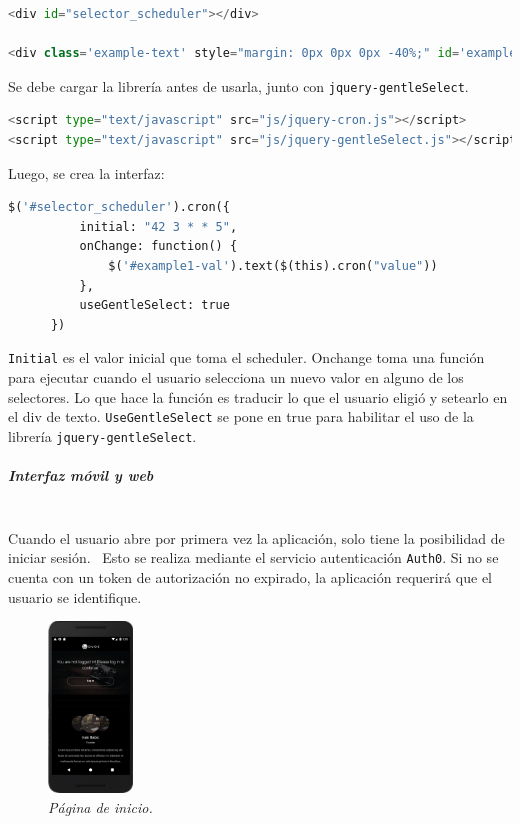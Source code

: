 \begin{lstlisting}[language=python]
<div id="selector_scheduler"></div>

<div class='example-text' style="margin: 0px 0px 0px -40%;" id='example1-val'></div>
\end{lstlisting}

Se debe cargar la librería antes de usarla, junto con \lstinline[columns=fixed]{jquery-gentleSelect}.

\begin{lstlisting}[language=python]
<script type="text/javascript" src="js/jquery-cron.js"></script>
<script type="text/javascript" src="js/jquery-gentleSelect.js"></script>
\end{lstlisting}

Luego, se crea la interfaz:

\begin{lstlisting}[language=python]
$('#selector_scheduler').cron({
          initial: "42 3 * * 5",
          onChange: function() {
              $('#example1-val').text($(this).cron("value"))
          },
          useGentleSelect: true
      })
\end{lstlisting}

\lstinline[columns=fixed]{Initial} es el valor inicial que toma el scheduler. Onchange toma una función para ejecutar cuando el usuario selecciona un nuevo valor en alguno de los selectores. Lo que hace la función es traducir lo que el usuario eligió y setearlo en el div de texto. \lstinline[columns=fixed]{UseGentleSelect} se pone en true para habilitar el uso de la librería \lstinline[columns=fixed]{jquery-gentleSelect}.


\subparagraph{Interfaz móvil y web}\mbox{}\mbox{}\\
Cuando el usuario abre por primera vez la aplicación, solo tiene la posibilidad de iniciar sesión.~ Esto se realiza mediante el servicio autenticación \lstinline[columns=fixed]{Auth0}. Si no se cuenta con un token de autorización no expirado, la aplicación requerirá que el usuario se identifique.

\begin{figure}[H]
  \centering
  \includegraphics[width=0.2\textwidth, keepaspectratio]{images/app-movil-home}
  \caption{\textit{Página de inicio.}}
  \label{fig:app-movil-home}
\end{figure}

